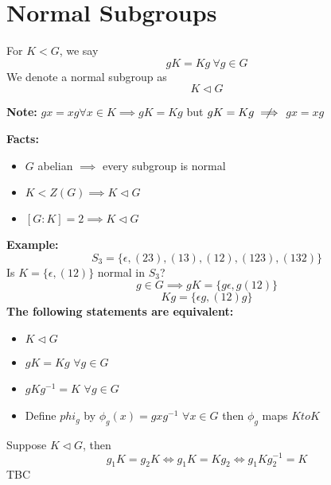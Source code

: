 \documentclass[openany]{report}
\begin{document}
\section{Normal Subgroups}
\begin{definition}
    For $K < G$, we say 
    \[gK = Kg \ \forall g \in G\]
    We denote a normal subgroup as 
    \[K \triangleleft G\]
\end{definition}
\begin{center}
    \textbf{Note:} $gx = xg \forall x \in K \implies gK = Kg$  but $gK = Kg \notimplies$ $gx = xg$
\end{center}
\textbf{Facts:}
\begin{itemize}
    \item $G$ abelian $\implies$ every subgroup is normal 
    \item $K < Z(G) \implies K \triangleleft G$
    \item $[G : K] = 2 \implies K \triangleleft G$ 
\end{itemize}
\textbf{Example:}
\[S_3 = \{\epsilon, (23), (13), (12), (123), (132)\}\]
Is $K = \{\epsilon, (12)\}$ normal in $S_3$? 
\[g \in G \implies gK = \{g\epsilon, g(12)\}\]
\[Kg = \{\epsilon g, (12)g\}\]
\textbf{The following statements are equivalent:}
\begin{itemize}
    \item $K \triangleleft G$
    \item $gK = Kg$ $\forall g \in G$
    \item $gKg^{-1} = K$ $\forall g \in G$
    \item Define $phi_g$ by $\phi_g(x) = gxg^{-1}$ $\forall x \in G$ then $\phi_g$ maps $K to K$
\end{itemize}
\begin{lemma}
    Suppose $K \triangleleft G$, then 
    \[g_1K = g_2K \iff g_1K = Kg_2 \iff g_1Kg_2^{-1} = K\]
    TBC
\end{lemma}
\end{document}
